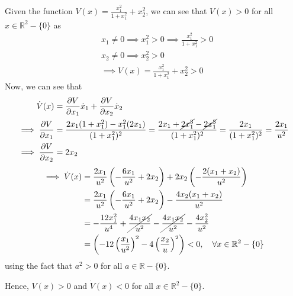Given the function \( \displaystyle V(x) = \frac{x_1^2}{1 + x_1^2} + x_2^2 \), we can see that \( V(x) > 0 \) for all \( x \in \mathbb{R}^2 - \{ 0 \} \) as
\begin{align*}
     &
    x_1 \neq 0
    \implies
    x_1^2 > 0
    \implies
    \frac{x_1^2}{1 + x_1^2} > 0
    \\ &
    x_2 \neq 0
    \implies
    x_2^2 > 0
    \\ &
    \implies
    V(x) =
    \frac{x_1^2}{1 + x_1^2} + x_2^2
    > 0
\end{align*}
Now, we can see that
\begin{align*}
    \dot{V}(x)
     & =
    \frac{\partial V}{\partial x_1} \dot{x}_1 + \frac{\partial V}{\partial x_2} \dot{x}_2
    \\
    \implies
    \frac{\partial V}{\partial x_1}
     & =
    \frac{2 x_1 (1 + x_1^2) - x_1^2 (2 x_1)}{(1 + x_1^2)^2}
    =
    \frac{2 x_1 + \cancel{2 x_1^3} - \cancel{2 x_1^3}}{(1 + x_1^2)^2}
    =
    \frac{2 x_1}{(1 + x_1^2)^2}
    =
    \frac{2 x_1}{u^2}
    \\
    \implies
    \frac{\partial V}{\partial x_2}
     & =
    2 x_2
\end{align*}
\begin{align*}
    \implies
    \dot{V}(x)
     & =
    \frac{2 x_1}{u^2} \left( -\frac{6 x_1}{u^2} + 2 x_2 \right) + 2 x_2 \left( -\frac{2 (x_1 + x_2)}{u^2} \right)
    \\ & =
    \frac{2 x_1}{u^2} \left( -\frac{6 x_1}{u^2} + 2 x_2 \right) - \frac{4 x_2 (x_1 + x_2)}{u^2}
    \\ & =
    -\frac{12 x_1^2}{u^4} + \cancel{\frac{4 x_1 x_2}{u^2}} - \cancel{\frac{4 x_1 x_2}{u^2}} - \frac{4 x_2^2}{u^2}
    \\ & =
    \left( -12 \left( \frac{x_1}{u^2} \right)^2 - 4 \left( \frac{x_2}{u} \right)^2 \right)
    <
    0,
    \quad
    \forall x \in \mathbb{R}^2 - \{ 0 \}
\end{align*}
using the fact that \( a^2 > 0 \) for all \( a \in \mathbb{R} - \{ 0 \} \).

Hence, \( V(x) > 0 \) and \( \dot{V}(x) < 0 \) for all \( x \in \mathbb{R}^2 - \{ 0 \} \).
